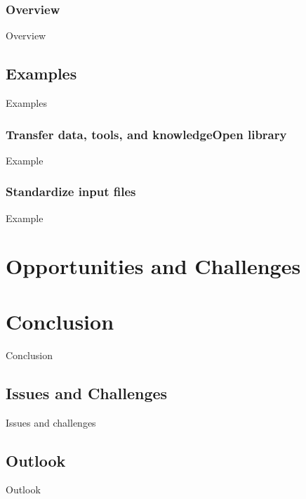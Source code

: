 \documentclass[remotesensing,article,submit,pdftex,moreauthors]{Definitions/mdpi}
\begin{document}
\subsubsection{Overview}
Overview

\subsection{Examples}
Examples

\subsubsection{Transfer data, tools, and knowledgeOpen library}
Example

\subsubsection{Standardize input files}
Example

\section{Opportunities and Challenges}

\section{Conclusion}
\label{sec:Conclusion}
Conclusion

\subsection{Issues and Challenges}
Issues and challenges

\subsection{Outlook}
Outlook


\vspace{6pt} 

\end{document}
